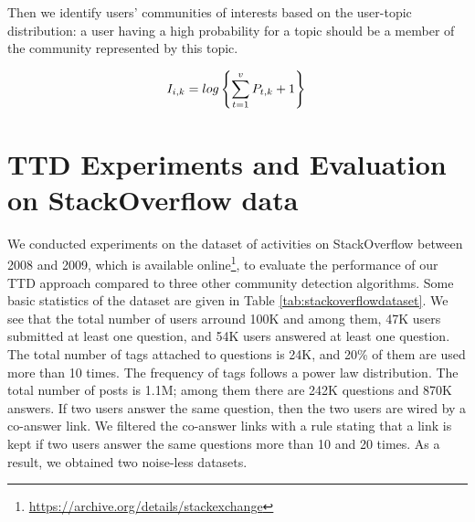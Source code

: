 Then we identify users' communities of interests based on the user-topic distribution: a user having a high probability for a topic should be a member of the community represented by this topic.

\begin{equation}
 I_{i,k} = log \left\{\sum_{t=1}^{v} P_{t,k}  +1 \right\}\\
\label{eq:getuserinterest}
\end{equation}




\section{TTD Experiments and Evaluation on StackOverflow data}\label{sec:TTDexperiment} 
We conducted experiments on the dataset of activities on StackOverflow between 2008 and 2009, which is available online\footnote{\url{https://archive.org/details/stackexchange}}, to evaluate the performance of our TTD approach compared to three other community detection algorithms. 
Some basic statistics of the dataset are given in Table \ref{tab:stackoverflowdataset}. We see that the total number of users arround 100K and among them, 47K users submitted at least one question, and 54K users answered at least one question. The total number of tags attached to questions is 24K, and 20\% of them are used more than 10 times. The frequency of tags follows a power law distribution. The total number of posts is 1.1M; among them there are 242K questions and 870K answers. If two users answer the same question, then the two users are wired by a co-answer link. We filtered the co-answer links with a rule stating that a link is kept if two users answer the same questions more than 10 and 20 times. As a result, we obtained two noise-less datasets. 


